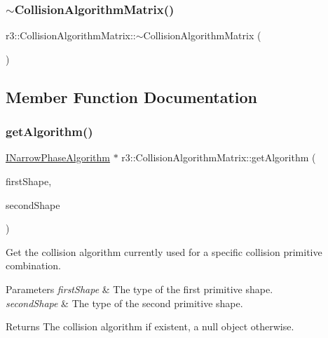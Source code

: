 \subsubsection{\texorpdfstring{$\sim$\+Collision\+Algorithm\+Matrix()}{~CollisionAlgorithmMatrix()}}
{\footnotesize\ttfamily r3\+::\+Collision\+Algorithm\+Matrix\+::$\sim$\+Collision\+Algorithm\+Matrix (\begin{DoxyParamCaption}{ }\end{DoxyParamCaption})\hspace{0.3cm}{\ttfamily [default]}}



\subsection{Member Function Documentation}
\mbox{\label{classr3_1_1_collision_algorithm_matrix_ad40e0f125b95d6bcdb2e8a27c1397e68}} 
\subsubsection{\texorpdfstring{get\+Algorithm()}{getAlgorithm()}}
{\footnotesize\ttfamily \mbox{\hyperlink{classr3_1_1_i_narrow_phase_algorithm}{I\+Narrow\+Phase\+Algorithm}} $\ast$ r3\+::\+Collision\+Algorithm\+Matrix\+::get\+Algorithm (\begin{DoxyParamCaption}\item[{Collision\+Primitive\+Type}]{first\+Shape,  }\item[{Collision\+Primitive\+Type}]{second\+Shape }\end{DoxyParamCaption})}



Get the collision algorithm currently used for a specific collision primitive combination. 


\begin{DoxyParams}{Parameters}
{\em first\+Shape} & The type of the first primitive shape. \\
\hline
{\em second\+Shape} & The type of the second primitive shape. \\
\hline
\end{DoxyParams}
\begin{DoxyReturn}{Returns}
The collision algorithm if existent, a null object otherwise. 
\end{DoxyReturn}
\mbox{\label{classr3_1_1_collision_algorithm_matrix_af2f1a16b0e3bbede20dc8559820525cb}} 
